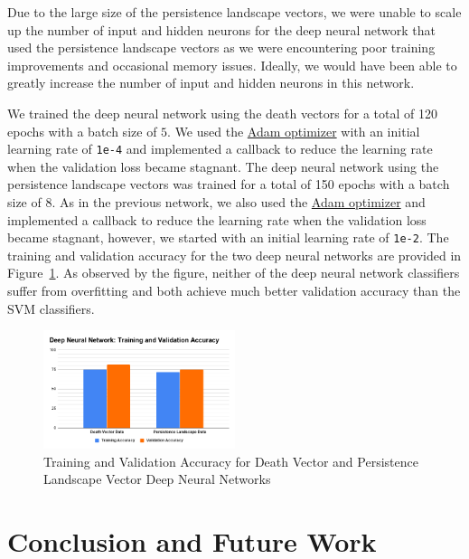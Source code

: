 \documentclass[11pt, reqno]{amsart}
\theoremstyle{plain}
\theoremstyle{definition}
\begin{document}
\noindent Due to the large size of the persistence landscape vectors, we were unable to scale up the number of input and hidden neurons for the deep neural network that used the persistence landscape vectors as we were encountering poor training improvements and occasional memory issues. Ideally, we would have been able to greatly increase the number of input and hidden neurons in this network.

We trained the deep neural network using the death vectors for a total of 120 epochs with a batch size of $5$. We used the \href{https://www.tensorflow.org/api_docs/python/tf/keras/optimizers/Adam}{Adam optimizer} with an initial learning rate of \texttt{1e-4} and implemented a callback to reduce the learning rate when the validation loss became stagnant. The deep neural network using the persistence landscape vectors was trained for a total of 150 epochs with a batch size of $8$. As in the previous network, we also used the \href{https://www.tensorflow.org/api_docs/python/tf/keras/optimizers/Adam}{Adam optimizer} and implemented a callback to reduce the learning rate when the validation loss became stagnant, however, we started with an initial learning rate of \texttt{1e-2}. The training and validation accuracy for the two deep neural networks are provided in Figure~\ref{fig:DNN_acc}. As observed by the figure, neither of the deep neural network classifiers suffer from overfitting and both achieve much better validation accuracy than the SVM classifiers.

\begin{figure}[H]
\centering
\includegraphics[width=0.5\textwidth]{DNN-Graph.png}
\caption{Training and Validation Accuracy for Death Vector and Persistence Landscape Vector Deep Neural Networks}
\label{fig:DNN_acc}
\end{figure}

\section{Conclusion and Future Work}
\end{document}
